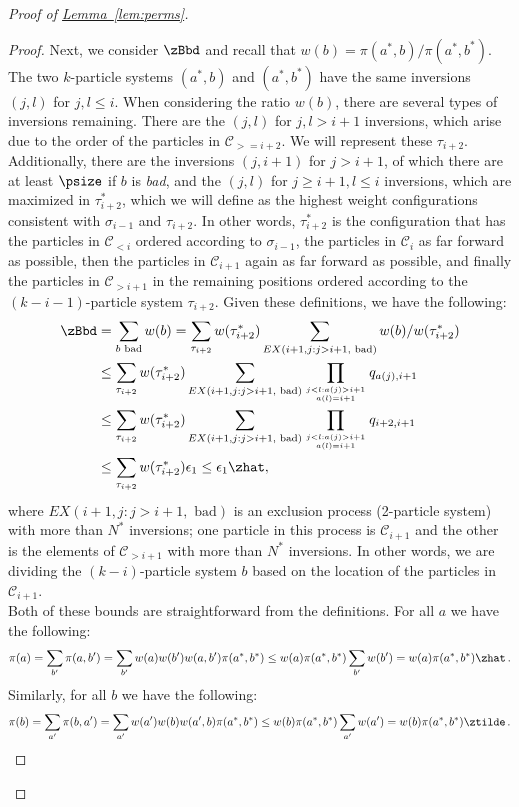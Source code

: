 \documentclass[11pt]{article}
\providecommand{\expref}[2]{\texorpdfstring{\hyperref[#2]{#1~\ref{#2}}}{#1~\ref{#2}}}
\begin{document}
\begin{proof}[Proof of \expref{Lemma}{lem:perms}]
\begin{proof}
Next, we consider $\zBbd$ and recall that $w(b) = 
\pi(a^*,b)/\pi(a^*,b^*).$  The two $k$-particle systems $(a^*,b)$ and 
$(a^*,b^*)$ have the same inversions $(j,l)$ for $j,l \leq i$.  When 
considering the ratio $w(b)$, there are several types of inversions 
remaining.  There are the $(j,l)$ for $j,l > i+1$ inversions, which 
arise due to the order of the particles in $\mathcal{C}_{>= i+2}$.  We 
will represent these $\tau_{i+2}$.  Additionally, there are the 
inversions $(j,i+1)$ for $j > i+1$, of which there are at least 
$\psize$ if $b$ is \emph{bad}, and the $(j,l)$ for $j \geq i+1, l \leq 
i$ inversions, which are maximized in $\tau_{i+2}^*$, which we will 
define as the highest weight configurations consistent with 
$\sigma_{i-1}$ and $\tau_{i+2}$. In other words, $\tau_{i+2}^*$ is the 
configuration that has the particles in $\mathcal{C}_{< i}$ ordered 
according to $\sigma_{i-1}$, the particles in $\mathcal{C}_{i}$ as far 
forward as possible, then the particles in $\mathcal{C}_{i+1}$ again as 
far forward as possible, and finally the particles in 
$\mathcal{C}_{>i+1}$ in the remaining positions ordered according to 
the $(k-i-1)$-particle system $\tau_{i+2}$.  Given these definitions, 
we have the following:
\begin{align*}
\zBbd &=  \sum_{b \text{ bad}} w(b)=  \sum_{\tau_{i+2}} w (\tau_{i+2}^*) \sum_{EX(i+1,j: j>i+1, \text{ bad})}w(b)/w(\tau_{i+2}^*) \\
&\leq \sum_{\tau_{i+2} }w (\tau_{i+2}^*) \sum_{EX(i+1,j: j>i+1, \text{ bad})}\prod_{j<l: a(j) > i +1\atop a(l) = i+1}q_{a(j), i+1} \\
&\leq \sum_{\tau_{i+2}} w (\tau_{i+2}^*) \sum_{EX(i+1,j: j>i+1, \text{ bad})}\prod_{j<l: a(j) > i +1\atop a(l) = i+1}q_{i+2, i+1} \\
&\leq \sum_{\tau_{i+2}} w (\tau_{i+2}^*)\epsilon_1 \leq \epsilon_1 \zhat,
\end{align*}
where $EX(i+1,j: j>i+1, \text{ bad})$ is an exclusion process 
(2-particle system) with more than $N^*$ inversions; one particle in 
this process is $\mathcal{C}_{i+1}$ and the other is the elements of 
$\mathcal{C}_{>i+1}$ with more than $N^*$ inversions.  In other words, 
we are dividing the $(k-i)$-particle system $b$ based on the location 
of the particles in $\mathcal{C}_{i+1}$.\\


Both of these bounds are straightforward from the definitions. 
For all $a$ we have the following:
 $$\pi(a) = \sum_{b'} \pi(a,b') = \sum_{b'} w(a)w(b')w(a,b')\pi(a^*,b^*) \leq w(a)\pi(a^*,b^*)\sum_{b'}w(b')= w(a)\pi(a^*,b^*)\zhat\,.$$
Similarly, for all $b$ we have the following:
 $$\pi(b) = \sum_{a'} \pi(b,a') = \sum_{a'} w(a')w(b)w(a',b)\pi(a^*,b^*) \leq w(b)\pi(a^*,b^*)\sum_{a'}w(a')= w(b)\pi(a^*,b^*)\ztilde\,.$$



\end{proof}
\end{proof}
\end{document}
